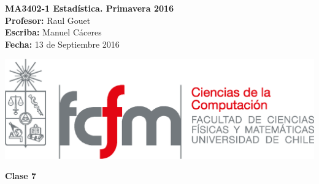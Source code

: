 \documentclass[10pt]{article}
\theoremstyle{plain}
\theoremstyle{definition}
\newcommand{\catnum}{7} %
\newcommand{\fecha}{13 de Septiembre 2016 }
\begin{document}
\vspace*{-1.2 cm}
\begin{minipage}{0.6\textwidth}
\begin{flushleft}
\hspace*{-0.5cm}\textbf{MA3402-1 Estadística. Primavera 2016}\\
\hspace*{-0.5cm}\textbf{Profesor:} Raul Gouet\\
\hspace*{-0.5cm}\textbf{Escriba:} Manuel Cáceres\\
\hspace*{-0.5cm}\textbf{Fecha:} \fecha
\end{flushleft}
\end{minipage}
\begin{minipage}{0.36\textwidth}
\begin{flushright}
\includegraphics[scale=0.3]{imagenes/fcfm_dcc}
\end{flushright}
\end{minipage}
\bigskip

\begin{center}
\LARGE\textbf{Clase \catnum}
\end{center}
\end{document}
